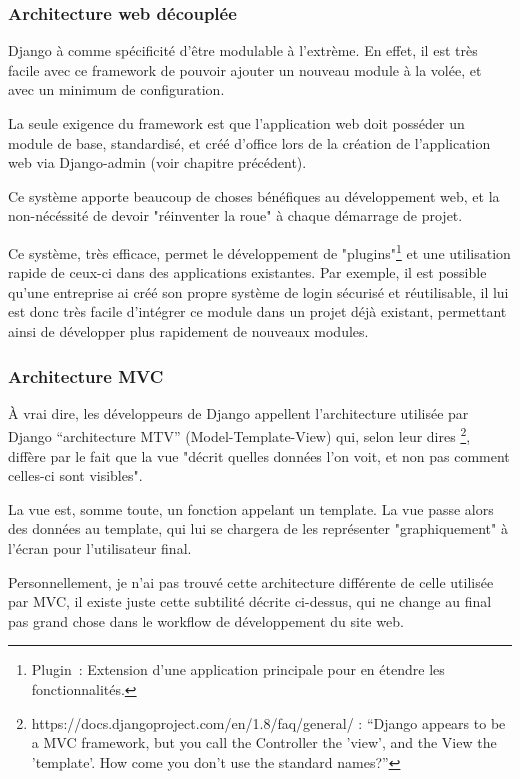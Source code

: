 \documentclass[12pt,table,a4paper]{report}
\begin{document}
\subsubsection{Architecture web découplée}
Django à comme spécificité d'être modulable à l'extrème. En effet, il est très facile avec ce framework de pouvoir ajouter un nouveau module à la volée, et avec un minimum de configuration.

La seule exigence du framework est que l'application web doit posséder un module de base, standardisé, et créé d'office lors de la création de l'application web via Django-admin (voir chapitre précédent).

Ce système apporte beaucoup de choses bénéfiques au développement web, et la non-nécéssité de devoir "réinventer la roue" à chaque démarrage de projet.

Ce système, très efficace, permet le développement de "plugins"\footnote{Plugin : Extension d'une application principale pour en étendre les fonctionnalités.} et une utilisation rapide de ceux-ci dans des applications existantes.
Par exemple, il est possible qu'une entreprise ai créé son propre système de login sécurisé et réutilisable, il lui est donc très facile d'intégrer ce module dans un projet déjà existant, permettant ainsi de développer plus rapidement de nouveaux modules.

\subsubsection{Architecture MVC}
À vrai dire, les développeurs de Django appellent l'architecture utilisée par Django "`architecture MTV"' (Model-Template-View) qui, selon leur dires \footnote{https://docs.djangoproject.com/en/1.8/faq/general/ : "`Django appears to be a MVC framework, but you call the Controller the 'view', and the View the 'template'. How come you don’t use the standard names?"'}, diffère par le fait que la vue "décrit quelles données l'on voit, et non pas comment celles-ci sont visibles".

La vue est, somme toute, un fonction appelant un template. La vue passe alors des données au template, qui lui se chargera de les représenter "graphiquement" à l'écran pour l'utilisateur final.

Personnellement, je n'ai pas trouvé cette architecture différente de celle utilisée par MVC, il existe juste cette subtilité décrite ci-dessus, qui ne change au final pas grand chose dans le workflow de développement du site web.
\end{document}
